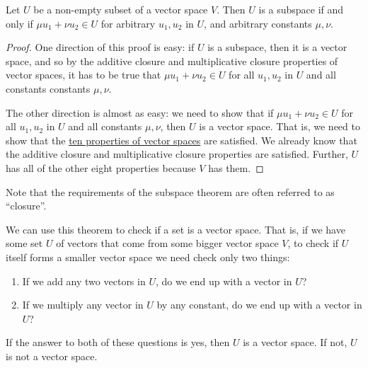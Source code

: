 
\begin{theorem}\label{subspacetheorem}
Let $U$ be a non-empty subset of a vector space $V$.  Then $U$ is a subspace if and only if $\mu u_1 + \nu u_2 \in U$ for arbitrary $u_1, u_2$ in $U$, and arbitrary constants $\mu, \nu$.  
\end{theorem}

\begin{proof}
One direction of this proof is easy: if \(U\) is a subspace, then it is a vector space, and so by the additive closure and multiplicative closure properties of vector spaces, it has to be true that \(\mu u_1 + \nu u_2 \in U\) for all \(u_1,u_2\) in \(U\) and all constants constants \(\mu, \nu\).

The other direction is almost as easy: we need to show that if \(\mu u_1 + \nu u_2 \in U\) for all \(u_1, u_2\) in \(U\) and all constants \(\mu, \nu\), then \(U\) is a vector space. That is, we need to show that the \hyperref[vectorspace]{ten properties of vector spaces} are satisfied. We already know that the additive closure and multiplicative closure properties are satisfied. Further, \(U\) has all of the other eight properties  because \(V\) has them. \end{proof}

\noindent
Note that the requirements of the subspace theorem are often referred to as ``closure''.

We can use this theorem to check if a set is a vector space. That is, if we have some set \(U\) of vectors that come from some bigger vector space \(V\), to check if \(U\) itself forms a smaller vector space we need check only two things: 
\begin{enumerate}
\item If we add any two vectors in \(U\), do we end up with a vector in \(U\)?
\item If we multiply any vector in \(U\) by any constant, do we end up with a vector in \(U\)? 
\end{enumerate}
If the answer to both of these questions is yes, then \(U\) is a vector space. If not, \(U\) is not a vector space.


